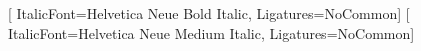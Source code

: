 \documentclass[letterpaper,11pt]{article}
\newcommand{\reslink}[2]{\href{#1}{\uline{#2}}}
\newcommand{\headerfontxi}{\resumemain}
\begin{document}
\headerfontxi
\newfontfamily{}[
  ItalicFont={Helvetica Neue Bold Italic}, Ligatures=NoCommon]
\renewcommand{\textbf}[1]{{\resumebold #1}}
\newfontfamily{}[
  ItalicFont={Helvetica Neue Medium Italic}, Ligatures=NoCommon]

\newcommand{\weblink}[2]{{\resumemain\footnotesize\reslink{#1}{#2}}\hspace{6pt}}


\end{document}
